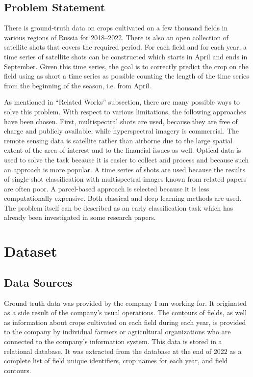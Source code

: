 \documentclass{article}
\begin{document}
\subsection{Problem Statement}

There is ground-truth data on crops cultivated on a few thousand fields in various regions of Russia for 2018–2022. There is also an open collection of satellite shots that covers the required period. For each field and for each year, a time series of satellite shots can be constructed which starts in April and ends in September. Given this time series, the goal is to correctly predict the crop on the field using as short a time series as possible counting the length of the time series from the beginning of the season, i.e. from April.

As mentioned in “Related Works” subsection, there are many possible ways to solve this problem. With respect to various limitations, the following approaches have been chosen. First, multispectral shots are used, because they are free of charge and publicly available, while hyperspectral imagery is commercial. The remote sensing data is satellite rather than airborne due to the large spatial extent of the area of interest and to the financial issues as well. Optical data is used to solve the task because it is easier to collect and process and because such an approach is more popular. A time series of shots are used because the results of single-shot classification with multispectral images known from related papers are often poor. A parcel-based approach is selected because it is less computationally expensive. Both classical and deep learning methods are used. The problem itself can be described as an early classification task which has already been investigated in some research papers.

\section{Dataset}

\subsection{Data Sources}

Ground truth data was provided by the company I am working for. It originated as a side result of the company's usual operations. The contours of fields, as well as information about crops cultivated on each field during each year, is provided to the company by individual farmers or agricultural organizations who are connected to the company's information system. This data is stored in a relational database. It was extracted from the database at the end of 2022 as a complete list of field unique identifiers, crop names for each year, and field contours.
\end{document}
